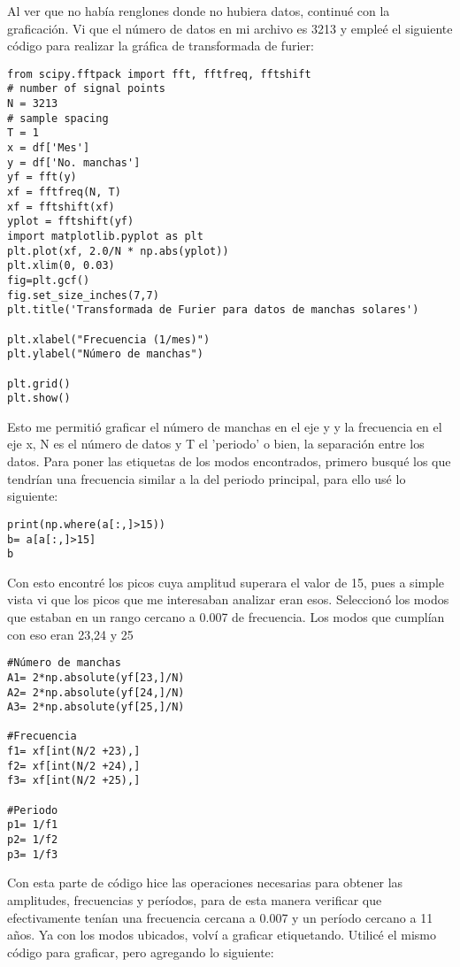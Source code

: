 \documentclass[12pt]{article}
\begin{document}
\begin{doublespace}
\begin{enumerate}
Al ver que no había renglones donde no hubiera datos, continué con la graficación. Vi que el número de datos en mi archivo es 3213 y empleé el siguiente código para realizar la gráfica de transformada de furier:

\begin{verbatim}
from scipy.fftpack import fft, fftfreq, fftshift
# number of signal points
N = 3213
# sample spacing
T = 1
x = df['Mes']
y = df['No. manchas']
yf = fft(y)
xf = fftfreq(N, T)
xf = fftshift(xf)
yplot = fftshift(yf)
import matplotlib.pyplot as plt
plt.plot(xf, 2.0/N * np.abs(yplot))
plt.xlim(0, 0.03)
fig=plt.gcf()
fig.set_size_inches(7,7)
plt.title('Transformada de Furier para datos de manchas solares')

plt.xlabel("Frecuencia (1/mes)")
plt.ylabel("Número de manchas")

plt.grid()
plt.show()
\end{verbatim}

Esto me permitió graficar el número de manchas en el eje y y la frecuencia en el eje x, N es el número de datos y T el 'periodo' o bien, la separación entre los datos. Para poner las etiquetas de los modos encontrados, primero busqué los que tendrían una frecuencia similar a la del periodo principal, para ello usé lo siguiente:

\begin{verbatim}
print(np.where(a[:,]>15))
b= a[a[:,]>15]
b
\end{verbatim}
Con esto encontré los picos cuya amplitud superara el valor de 15, pues a simple vista vi que los picos que me interesaban analizar eran esos. Seleccionó los modos que estaban en un rango cercano a 0.007 de frecuencia. Los modos que cumplían con eso eran 23,24 y 25

\begin{verbatim}
#Número de manchas
A1= 2*np.absolute(yf[23,]/N)
A2= 2*np.absolute(yf[24,]/N)
A3= 2*np.absolute(yf[25,]/N)

#Frecuencia
f1= xf[int(N/2 +23),]
f2= xf[int(N/2 +24),]
f3= xf[int(N/2 +25),]

#Periodo
p1= 1/f1
p2= 1/f2
p3= 1/f3
\end{verbatim}
Con esta parte de código hice las operaciones necesarias para obtener las amplitudes, frecuencias y períodos, para de esta manera verificar que efectivamente tenían una frecuencia cercana a 0.007 y un período cercano a 11 años. Ya con los modos ubicados, volví a graficar etiquetando. Utilicé el mismo código para graficar, pero agregando lo siguiente:


\end{enumerate}
\end{doublespace}
\end{document}
